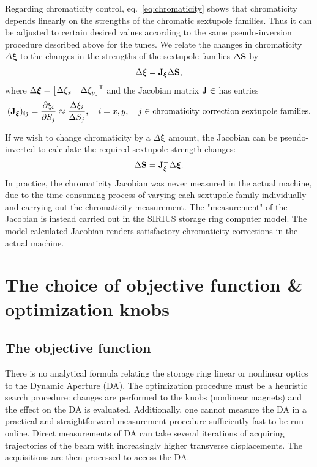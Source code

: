 Regarding chromaticity control, eq.~\eqref{eq:chromaticity} shows that chromaticity depends linearly on the strengths of the chromatic sextupole families. Thus it can be adjusted to certain desired values according to the same pseudo-inversion procedure described above for the tunes. We relate the changes in chromaticity $\Delta \boldsymbol{\xi}$ to the changes in the strengths of the sextupole families $\Delta \vb{S}$ by
\begin{equation}
    \Delta\boldsymbol{\xi} = \vb{J}_{\boldsymbol{\xi}}\Delta \vb{S},
\end{equation}
where $\Delta\boldsymbol{\xi} = \mqty*[\Delta \xi_x & \Delta \xi_y]^\intercal$ and the Jacobian matrix $\vb{J}\in$ has entries
\begin{equation}
    (\vb{J}_{\boldsymbol{\xi}})_{ij} = \pdv{\xi_{i}}{S_j} \approx \frac{\Delta \xi_{i}}{\Delta S_j},\quad i=x, y, \quad j\in\text{chromaticity correction sextupole families}.
\end{equation}

If we wish to change chromaticity by a $\Delta\boldsymbol{\xi}$ amount, the Jacobian can be pseudo-inverted to calculate the required sextupole strength changes:
\begin{equation}
    \Delta \vb{S} = \vb{J}_{\xi}^{+}\Delta \boldsymbol{\xi}.
\end{equation}
In practice, the chromaticity Jacobian was never measured in the actual machine, due to the time-consuming process of varying each sextupole family individually and carrying out the chromaticity measurement. The "measurement" of the Jacobian is instead carried out in the SIRIUS storage ring computer model. The model-calculated Jacobian renders satisfactory chromaticity corrections in the actual machine.

\section{The choice of objective function \& optimization knobs}

\subsection{The objective function}
\label{subsec:objective_function}
There is no analytical formula relating the storage ring linear or nonlinear optics to the Dynamic Aperture (\gls*{DA}). The optimization procedure must be a heuristic search procedure: changes are performed to the knobs (nonlinear magnets) and the effect on the \gls*{DA} is evaluated. Additionally, one cannot measure the \gls*{DA} in a practical and straightforward measurement procedure sufficiently fast to be run online. Direct measurements of \gls*{DA} can take several iterations of acquiring trajectories of the beam with increasingly higher transverse displacements. The acquisitions are then processed to access the \gls*{DA}.

